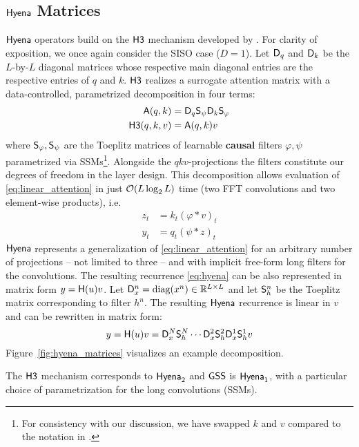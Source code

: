 \subsection{${\sf Hyena}$ Matrices} 
%
${\sf Hyena}$ operators build on the ${\sf H3}$ mechanism developed by \citep{dao2022hungry}. For clarity of exposition, we once again consider the SISO case ($D=1$). Let $\mathsf{D}_q$ and $\mathsf{D}_k$ be the $L$-by-$L$ diagonal matrices whose respective main diagonal entries are the respective entries of $q$ and $k$. ${\sf H3}$ realizes a surrogate attention matrix with a data-controlled, parametrized decomposition in four terms:
%
\begin{equation}\label{eq:linear_attention}
    \begin{aligned}
        \mathsf{A}(q,k) &= \mathsf{D}_q \mathsf{S}_\psi \mathsf{D}_k \mathsf{S}_\varphi \\
        {\sf H3}(q, k, v) &= \mathsf{A}(q,k) v
    \end{aligned}
\end{equation}
%
where $\mathsf{S}_\varphi,\mathsf{S}_\psi$ are the Toeplitz matrices of learnable \textbf{causal} filters $\varphi,\psi$ parametrized via SSMs\footnote{For consistency with our discussion, we have swapped $k$ and $v$ compared to the notation in \citep{dao2022hungry}.}. Alongside the $qkv$-projections the filters constitute our degrees of freedom in the layer design. This decomposition allows evaluation of \eqref{eq:linear_attention} in just $\mathcal{O}(L \log_2 L)$ time (two FFT convolutions and two element-wise products), i.e.
%
\begin{equation}
    \begin{aligned}
        z_{t} &= k_{t}(\varphi * v)_t \\
        y_{t} &= q_{t}(\psi * z)_t
    \end{aligned}
\end{equation}
%
$\small \sf Hyena$ represents a generalization of \eqref{eq:linear_attention} for an arbitrary number of projections -- not limited to three -- and with implicit free-form long filters for the convolutions. The resulting recurrence \eqref{eq:hyena} can be also represented in matrix form $y=\mathsf{H}(u)v$. Let $\mathsf{D}_x^n=\operatorname{diag}(x^n)\in\mathbb{R}^{L\times L}$ and let $\mathsf{S}_h^n$ be the Toeplitz matrix corresponding to filter $h^n$. The resulting $\sf Hyena$ recurrence is linear in $v$ and can be rewritten in matrix form:
%
\[
    y = \mathsf{H}(u)v = \mathsf{D}_x^N\mathsf{S}_h^N \cdots \mathsf{D}_x^2\mathsf{S}_h^2\mathsf{D}_{x}^1\mathsf{S}_h^1 v
\]
%
Figure~\ref{fig:hyena_matrices} visualizes an example decomposition.
%
\begin{remark}
    The $\sf H3$ mechanism \citep{dao2022hungry} corresponds to ${\sf Hyena}_2$ and $\sf GSS$ \citep{mehta2022long} is ${\sf Hyena}_{1}$, with a particular choice of parametrization for the long convolutions (SSMs).
\end{remark}
